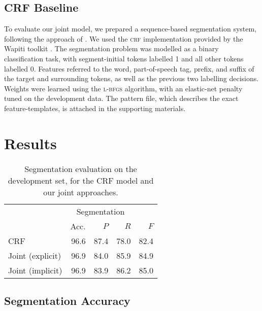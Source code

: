 \documentclass[11pt,letterpaper]{article}
\begin{document}
\subsection{CRF Baseline}
\label{sec:crf}

To evaluate our joint model, we prepared a sequence-based segmentation system,
following the approach of \citet{liu:05}.  We used the \textsc{crf} implementation
provided by the Wapiti toolkit \citep{wapiti}.
The segmentation problem was modelled as a binary classification task, with
segment-initial
tokens labelled 1 and all other tokens labelled 0.
Features referred to the word, part-of-speech tag, prefix, and suffix of the
target and surrounding tokens, as well as the previous two labelling decisions.
Weights were learned using the \textsc{l-bfgs} algorithm,
with an elastic-net penalty tuned on the development data.  The pattern file,
which describes the exact feature-templates, is attached in the supporting
materials.

\section{Results}

\label{sec:results}

\begin{table}
    \centering
    \small
    \begin{tabular}{l|rrrr}
        \hline
               & \multicolumn{3}{c}{Segmentation} \\
               & Acc. & $P$ & $R$ & $F$ \\
        \hline
        CRF              & 96.6 & 87.4 & 78.0 & 82.4 \\
        Joint (explicit) & 96.9 & 84.0 & 85.9 & 84.9 \\
        Joint (implicit) & 96.9 & 83.9 & 86.2 & 85.0 \\
        \hline
    \end{tabular}
    \caption{\small Segmentation evaluation on the development set, for
    the CRF model and our joint approaches.\label{tab:sbd_eval}}
    \vspace*{-4em}
\end{table}

\subsection{Segmentation Accuracy}
\end{document}
